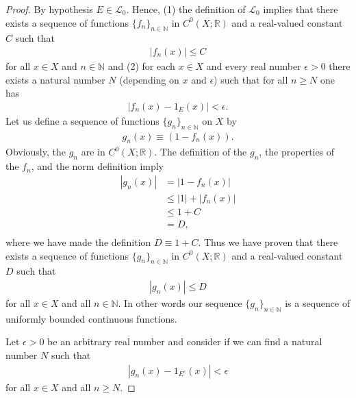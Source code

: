 \begin{proof}
By hypothesis $E \in \mathcal{L}_0$. Hence, (1) the definition of $\mathcal{L}_0$ implies that there exists a sequence of functions $\{ f_n \}_{n \in \mathbb{N}}$ in $C^0(X; \mathbb{R})$ and a real-valued constant $C$ such that
\begin{align}
    \left\lvert f_n(x) \right\rvert \le C
\end{align}
for all $x \in X$ and $n \in \mathbb{N}$ and (2) for each $x \in X$ and every real number $\epsilon > 0$ there exists a natural number $N$ (depending on $x$ and $\epsilon$) such that for all $n \ge N$ one has
\begin{align}
    \left\lvert f_n(x) - 1_E(x) \right\rvert < \epsilon.
\end{align}
Let us define a sequence of functions $\{ g_n \}_{n \in \mathbb{N}}$ on $X$ by
\begin{align}
    g_n(x) \equiv (1 - f_n(x)). 
\end{align}
Obviously, the $g_n$ are in $C^0(X; \mathbb{R})$. The definition of the $g_n$, the properties of the $f_n$, and the norm definition imply
\begin{align}
    \left\lvert g_n(x) \right\rvert &=   \left\lvert 1 - f_n(x) \right\rvert \\
                          &\le \left\lvert 1 \right\rvert + \left\lvert f_n(x) \right\rvert \\
                          &\le 1 + C \\
                          &=   D,  \\
\end{align}
where we have made the definition $D \equiv 1 + C$. Thus we have proven that there exists a sequence of functions $\{ g_n \}_{n \in \mathbb{N}}$ in $C^0(X; \mathbb{R})$ and a real-valued constant $D$ such that
\begin{align}
    \left\lvert g_n(x) \right\rvert \le D
\end{align}
for all $x \in X$ and all $n \in \mathbb{N}$. In other words our sequence $\{ g_n \}_{n \in \mathbb{N}}$ is a sequence of uniformly bounded continuous functions.

Let $\epsilon > 0$ be an arbitrary real number and consider if we can find a natural number $N$ such that
\begin{align}
    \left\lvert g_n(x) - 1_{E^c}(x) \right\rvert < \epsilon
\end{align}
for all $x \in X$ and all $n \ge N$.


\end{proof}
